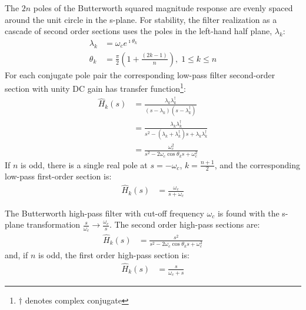 \documentclass[a4paper,twoside,10pt,english]{report}
\begin{document}
The $2n$ poles of the Butterworth squared magnitude response are evenly spaced
around the unit circle in the s-plane. For stability, the filter realization 
as a cascade of second order sections uses the poles in the left-hand half
plane, $\lambda_{k}$:
\begin{align*}
\lambda_{k}&=\omega_{c} e^{\imath\theta_{k}} \\
\theta_{k}&=
\frac{\pi}{2}\left(1+\frac{\left( 2 k-1 \right)}{n}\right),\; 1\le k\le n
\end{align*}
For each conjugate pole pair the corresponding low-pass filter second-order
section with unity DC gain has transfer
function\footnote{$\dagger$ denotes complex conjugate}:
\begin{align*}
\hat{H}_{k}\left(s\right)&=\frac{\lambda_{k}\lambda_{k}^{\dagger}}
{\left(s-\lambda_{k}\right)\left(s-\lambda_{k}^{\dagger}\right)}\\
&=\frac{\lambda_{k}\lambda_{k}^{\dagger}}
{s^{2}-\left(\lambda_{k}+\lambda_{k}^{\dagger}\right)s+
  \lambda_{k}\lambda_{k}^{\dagger}}\\
&= \frac{\omega_{c}^{2}}{s^{2}-2\omega_{c}\cos\theta_{k} s +\omega_{c}^{2}}
\end{align*}
If $n$ is odd, there is a single real pole at $s=-\omega_{c}$,
$k=\frac{n+1}{2}$, and the corresponding low-pass first-order section is:
\begin{align*}
\hat{H}_{k}\left(s\right)&=\frac{\omega_{c}}{s+\omega_{c}}
\end{align*}

The Butterworth high-pass filter with cut-off frequency $\omega_{c}$ is found
with the s-plane transformation
$\frac{s}{\omega_{c}}\rightarrow\frac{\omega_{c}}{s}$. The second order
high-pass sections are:
\begin{align*}
  \hat{H}_{k}\left(s\right)&=
  \frac{s^{2}}{s^{2}-2\omega_{c}\cos\theta_{k} s +\omega_{c}^{2}}
\end{align*}
and, if $n$ is odd, the first order high-pass section is:
\begin{align*}
\hat{H}_{k}\left(s\right)&=\frac{s}{\omega_{c} + s}
\end{align*}
\end{document}
